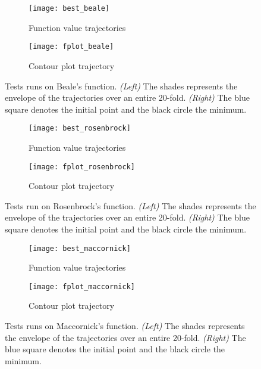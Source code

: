 {			\begin{figure}[h!]
			\centering
			\begin{subfigure}[b]{0.45\linewidth}
			{
				\centering
				\texttt{[image: best\_beale]}
				\caption{Function value trajectories}
				\label{fig::beale_eval}
			}
			\end{subfigure}
			\hfill
			\begin{subfigure}[b]{0.45\linewidth}
			{
				\centering
				\texttt{[image: fplot\_beale]}
				\caption{Contour plot trajectory}
				\label{fig::beale_eval_traj}
			}
			\end{subfigure}
		\caption[Tests runs on Beale's function]{Tests runs on Beale's function. \emph{(Left)} The shades represents the envelope of the trajectories over an entire 20-fold. \emph{(Right)} The blue square denotes the initial point and the black circle the minimum.}
		\label{fig::beales}
		\end{figure}
		
		\begin{figure}[h!]
			\centering
			\begin{subfigure}[b]{0.45\linewidth}
			{
				\centering
				\texttt{[image: best\_rosenbrock]}
				\caption{Function value trajectories}
				\label{fig::rosenbrock_eval}
			}
			\end{subfigure}
			\hfill
			\begin{subfigure}[b]{0.45\linewidth}
			{
				\centering
				\texttt{[image: fplot\_rosenbrock]}
				\caption{Contour plot trajectory}
				\label{fig::rosenbrock_eval_traj}
			}
			\end{subfigure}
		\caption[Tests runs on Rosenbrock's function]{Tests run on Rosenbrock's function. \emph{(Left)} The shades represents the envelope of the trajectories over an entire 20-fold. \emph{(Right)} The blue square denotes the initial point and the black circle the minimum.}
		\label{fig::rosenbrocks}
		\end{figure}
		
		\begin{figure}[h!]
			\centering
			\begin{subfigure}[b]{0.45\linewidth}
			{
				\centering
				\texttt{[image: best\_maccornick]}
				\caption{Function value trajectories}
				\label{fig::maccornick_eval}
			}
			\end{subfigure}
			\hfill
			\begin{subfigure}[b]{0.45\linewidth}
			{
				\centering
				\texttt{[image: fplot\_maccornick]}
				\caption{Contour plot trajectory}
				\label{fig::maccornick_eval_traj}
			}
			\end{subfigure}
		\caption[Tests runs on Maccornick's]{Tests runs on Maccornick's function. \emph{(Left)} The shades represents the envelope of the trajectories over an entire 20-fold. \emph{(Right)} The blue square denotes the initial point and the black circle the minimum.}
		\label{fig::maccornicks}
		\end{figure}
		
}

